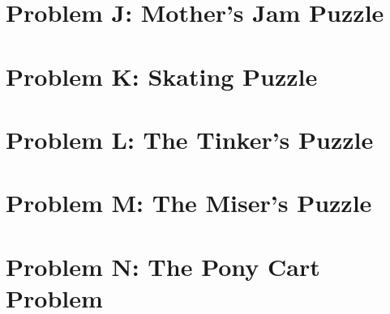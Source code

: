 \documentclass[12pt]{article}
\begin{document}
\pagebreak
\section{Problem J: Mother's Jam Puzzle}


\pagebreak
\section{Problem K: Skating Puzzle}


\pagebreak
\section{Problem L: The Tinker's Puzzle}


\pagebreak
\section{Problem M: The Miser's Puzzle}


\pagebreak
\section{Problem N: The Pony Cart Problem}

\end{document}
